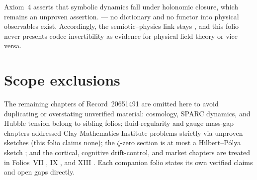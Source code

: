 \documentclass{alienfolio}
\begin{document}
 Axiom~4
asserts that symbolic dynamics fall under holonomic closure, which
remains an unproven assertion.  --- no dictionary and no functor into physical
observables exist. Accordingly, the semiotic--physics link stays
, and this folio never presents codec invertibility as
evidence for physical field theory or vice versa.

\section{Scope exclusions}

The remaining chapters of Record~20651491 \cite{rec20651491} are omitted
here to avoid duplicating or overstating unverified material:
cosmology, SPARC dynamics, and Hubble tension belong to sibling folios;
fluid-regularity and gauge mass-gap chapters addressed Clay Mathematics
Institute problems strictly via unproven sketches (this folio claims
none); the $\zeta$-zero section is at most a Hilbert--P\'olya sketch
; and the cortical, cognitive drift-control, and
market chapters are treated in Folios~VII \cite{folio-vii}, IX
\cite{folio-ix}, and XIII \cite{folio-xiii}. Each companion folio states
its own verified claims and open gaps directly.

\goldrule
\end{document}
